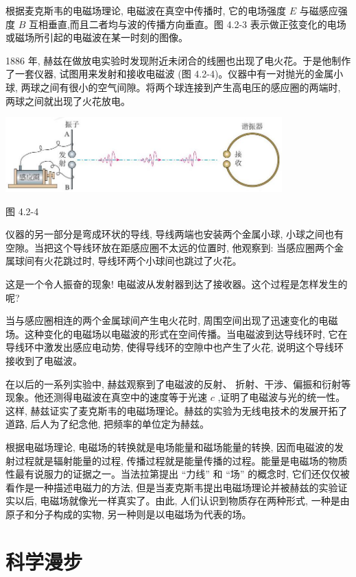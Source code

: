\documentclass[10pt]{article}
\begin{document}
根据麦克斯韦的电磁场理论, 电磁波在真空中传播时, 它的电场强度 \(E\) 与磁感应强度 \(B\) 互相垂直,而且二者均与波的传播方向垂直。图 4.2-3 表示做正弦变化的电场或磁场所引起的电磁波在某一时刻的图像。

1886 年, 赫兹在做放电实验时发现附近未闭合的线圈也出现了电火花。于是他制作了一套仪器, 试图用来发射和接收电磁波 (图 4.2-4)。仪器中有一对抛光的金属小球, 两球之间有很小的空气间隙。将两个球连接到产生高电压的感应圈的两端时, 两球之间就出现了火花放电。

\begin{center}
\includegraphics[max width=0.8\textwidth]{images/01910e72-c5b7-7ed5-a6d4-fb3a5faefc32_82_548125.jpg}
\end{center}

图 4.2-4

仪器的另一部分是弯成环状的导线, 导线两端也安装两个金属小球, 小球之间也有空隙。当把这个导线环放在距感应圈不太远的位置时, 他观察到: 当感应圈两个金属球间有火花跳过时, 导线环两个小球间也跳过了火花。

这是一个令人振奋的现象! 电磁波从发射器到达了接收器。这个过程是怎样发生的呢?

当与感应圈相连的两个金属球间产生电火花时, 周围空间出现了迅速变化的电磁场。这种变化的电磁场以电磁波的形式在空间传播。当电磁波到达导线环时, 它在导线环中激发出感应电动势, 使得导线环的空隙中也产生了火花, 说明这个导线环接收到了电磁波。

在以后的一系列实验中, 赫兹观察到了电磁波的反射、 折射、干涉、偏振和衍射等现象。他还测得电磁波在真空中的速度等于光速 \(c\) ,证明了电磁波与光的统一性。这样, 赫兹证实了麦克斯韦的电磁场理论。赫兹的实验为无线电技术的发展开拓了道路, 后人为了纪念他, 把频率的单位定为赫兹。

根据电磁场理论, 电磁场的转换就是电场能量和磁场能量的转换, 因而电磁波的发射过程就是辐射能量的过程, 传播过程就是能量传播的过程。能量是电磁场的物质性最有说服力的证据之一。当法拉第提出 “力线” 和 “场” 的概念时, 它们还仅仅被看作是一种描述电磁力的方法, 但是当麦克斯韦提出电磁场理论并被赫兹的实验证实以后, 电磁场就像光一样真实了。由此, 人们认识到物质存在两种形式, 一种是由原子和分子构成的实物, 另一种则是以电磁场为代表的场。

\section*{科学漫步}
\end{document}
